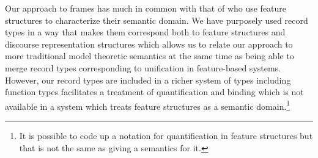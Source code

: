 Our approach to frames has much in common with that of
\cite{KallmeyerOsswald2013} who use feature structures to characterize
their semantic domain.  We have purposely used record types in a way
that makes them correspond both to feature structures and discourse
representation structures which allows us to relate our approach to
more traditional model theoretic semantics at the same time as being
able to merge record types corresponding to unification in
feature-based systems.  However, our record types are included in a
richer system of types including function types facilitates a
treatment of quantification and binding which is not available in a
system which treats feature structures as a semantic
domain.\footnote{It is possible to code up a notation for
  quantification in feature structures but that is not the same as
  giving a semantics for it.}


 

